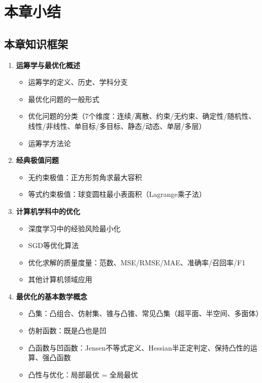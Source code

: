 \section{本章小结}\label{sec:ch1-summary}

\subsection{本章知识框架}

\begin{conceptbox}[第一章核心内容]
\begin{enumerate}[label=\arabic*., leftmargin=2em]
    \item \textbf{运筹学与最优化概述}
    \begin{itemize}
        \item 运筹学的定义、历史、学科分支
        \item 最优化问题的一般形式
        \item 优化问题的分类（7个维度：连续/离散、约束/无约束、确定性/随机性、线性/非线性、单目标/多目标、静态/动态、单层/多层）
        \item 运筹学方法论
    \end{itemize}
    \item \textbf{经典极值问题}
    \begin{itemize}
        \item 无约束极值：正方形剪角求最大容积
        \item 等式约束极值：球变圆柱最小表面积（Lagrange乘子法）
    \end{itemize}
    \item \textbf{计算机学科中的优化}
    \begin{itemize}
        \item 深度学习中的经验风险最小化
        \item SGD等优化算法
        \item 优化求解的质量度量：范数、MSE/RMSE/MAE、准确率/召回率/F1
        \item 其他计算机领域应用
    \end{itemize}
    \item \textbf{最优化的基本数学概念}
    \begin{itemize}
        \item 凸集：凸组合、仿射集、锥与凸锥、常见凸集（超平面、半空间、多面体）
        \item 仿射函数：既是凸也是凹
        \item 凸函数与凹函数：Jensen不等式定义、Hessian半正定判定、保持凸性的运算、强凸函数
        \item 凸性与优化：局部最优 = 全局最优
    \end{itemize}
\end{enumerate}
\end{conceptbox}

